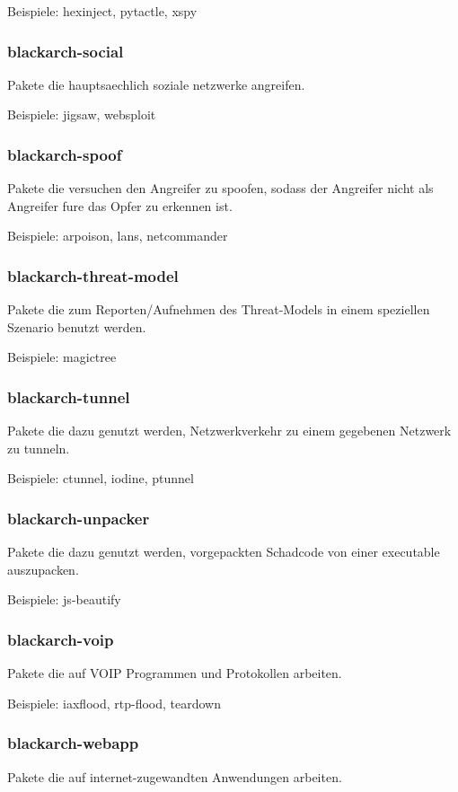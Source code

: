 \documentclass[a4paper, oneside, 11pt]{book}
\begin{document}
Beispiele: hexinject, pytactle, xspy

\subsubsection{blackarch-social}
Pakete die hauptsaechlich soziale netzwerke angreifen.

Beispiele: jigsaw, websploit

\subsubsection{blackarch-spoof}
Pakete die versuchen den Angreifer zu spoofen, 
sodass der Angreifer nicht als Angreifer fure das Opfer zu 
erkennen ist.

Beispiele: arpoison, lans, netcommander

\subsubsection{blackarch-threat-model}
Pakete die zum Reporten/Aufnehmen des Threat-Models
in einem speziellen Szenario benutzt werden.

Beispiele: magictree

\subsubsection{blackarch-tunnel}
Pakete die dazu genutzt werden, Netzwerkverkehr zu einem
gegebenen Netzwerk zu tunneln.

Beispiele: ctunnel, iodine, ptunnel

\subsubsection{blackarch-unpacker}
Pakete die dazu genutzt werden, vorgepackten Schadcode von 
einer executable auszupacken.

Beispiele: js-beautify

\subsubsection{blackarch-voip}
Pakete die auf VOIP Programmen und Protokollen arbeiten.

Beispiele: iaxflood, rtp-flood, teardown

\subsubsection{blackarch-webapp}
Pakete die auf internet-zugewandten Anwendungen arbeiten.
\end{document}
